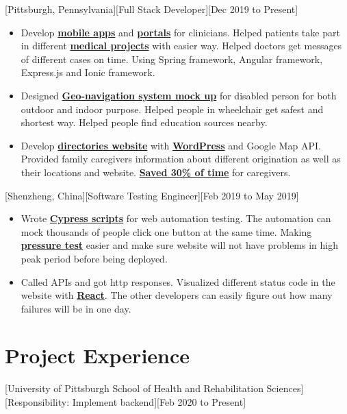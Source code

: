 \documentclass{article}
\begin{document}
[Pittsburgh, Pennsylvania][Full Stack Developer][Dec 2019 to Present]
\begin{itemize}
\item Develop \textbf{\underline{mobile apps}} and \textbf{\underline{portals}} for clinicians. Helped patients take part in different \textbf{\underline{medical projects}} with easier way. Helped doctors get messages of different cases on time. Using Spring framework, Angular framework, Express.js and Ionic framework.

\item Designed \textbf{\underline{Geo-navigation system mock up}} for disabled person for both outdoor and indoor purpose. Helped people in wheelchair get safest and shortest way. Helped people find education sources nearby.

\item Develop \textbf{\underline{directories website}} with \textbf{\underline{WordPress}} and  Google Map API. Provided family caregivers information about different origination as well as their locations and website. \textbf{\underline{Saved 30\% of time}} for caregivers.
\end{itemize}

[Shenzheng, China][Software Testing Engineer][Feb 2019 to May 2019]
\begin{itemize}
\item Wrote  \textbf{\underline{Cypress scripts}} for web automation testing. The automation can mock thousands of people click one button at the same time. Making \textbf{\underline{pressure test}} easier and make sure website will not have problems in high peak period before being deployed.

\item Called APIs and got http responses. Visualized different status code in the website with \textbf{\underline{React}}. The other developers can easily figure out how many failures will be in one day.
\end{itemize}


 
\section{Project Experience}

[University of Pittsburgh School of Health and Rehabilitation Sciences]
[Responsibility: Implement backend][Feb 2020 to Present]
\end{document}
